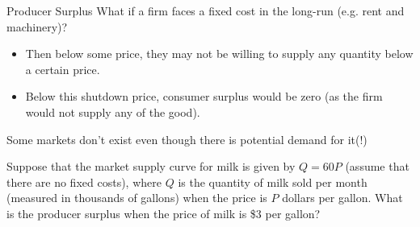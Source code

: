 \documentclass[11pt,t]{beamer}
\begin{document}
\begin{frame}{Producer Surplus}
  What if a firm faces a fixed cost in the long-run (e.g. rent and machinery)?

  \begin{itemize}
    \item Then below some price, they may not be willing to supply any quantity below a certain price.
    
    \item Below this shutdown price, consumer surplus would be zero (as the firm would not supply any of the good).
  \end{itemize}

  Some markets don't exist even though there is potential demand for it(!)
\end{frame}

\begin{frame}{}
  Suppose that the market supply curve for milk is given by $Q = 60P$ (assume that there are no fixed costs), where $Q$ is the quantity of milk sold per month (measured in thousands of gallons) when the price is $P$ dollars per gallon. What is the producer surplus when the price of milk is \$3 per gallon?
\end{frame}
\end{document}
